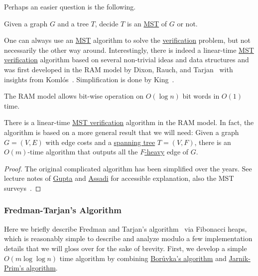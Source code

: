 Perhaps an easier question is the following.

\begin{problem}\label{prb:MST-verification}
Given a graph \(G\) and a tree \(T\), decide \(T\) is an \hyperref[prb:MST]{MST} of \(G\) or not.
\end{problem}

One can always use an \hyperref[prb:MST]{MST} algorithm to solve the \hyperref[prb:MST-verification]{verification} problem, but not necessarily the other way around. Interestingly, there is indeed a linear-time \hyperref[prb:MST-verification]{MST verification} algorithm based on several non-trivial ideas and data structures and was first developed in the RAM model by Dixon, Rauch, and Tarjan~\cite{dixon1992verification} with insights from Komlós~\cite{komlos1985linear}. Simplification is done by King~\cite{king1997simpler}.

\begin{note}
	The RAM model allows bit-wise operation on \(O(\log n)\) bit words in \(O(1)\) time.
\end{note}

\begin{theorem}\label{thm:MST-verification}
	There is a linear-time \hyperref[prb:MST-verification]{MST verification} algorithm in the RAM model. In fact, the algorithm is based on a more general result that we will need: Given a graph \(G = (V, E)\) with edge costs and a \hyperref[def:spanning-tree]{spanning tree} \(T = (V, F)\), there is an \(O(m)\)-time algorithm that outputs all the \hyperref[def:heavy]{\(F\)-heavy} edge of \(G\).
\end{theorem}
\begin{proof}
	The original complicated algorithm has been simplified over the years. See lecture notes of \href{https://www.cs.cmu.edu/~15850/notes/lec1.pdf}{Gupta} and \href{https://sepehr.assadi.info/courses/cs860-w24/Lectures/lec1.pdf}{Assadi} for accessible explanation, also the MST surveys~\cite{eisner1997state,marevs2008saga}.
\end{proof}

\subsubsection{Fredman-Tarjan's Algorithm}
Here we briefly describe Fredman and Tarjan's algorithm~\cite{fredman1987fibonacci,marevs2008saga} via Fibonacci heaps, which is reasonably simple to describe and analyze modulo a few implementation details that we will gloss over for the sake of brevity. First, we develop a simple \(O(m \log \log n)\) time algorithm by combining \hyperref[algo:Boruvka]{Borůvka's algorithm} and \hyperref[algo:Jarnik-Prim]{Jarnik-Prim's algorithm}.

